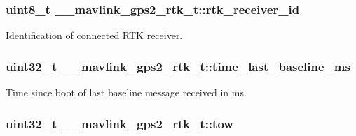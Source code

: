 \hypertarget{struct____mavlink__gps2__rtk__t_abae1e17d351ebd96bb155c3843fb5ee5}{
\subsubsection[{rtk\+\_\+receiver\+\_\+id}]{\setlength{\rightskip}{0pt plus 5cm}uint8\+\_\+t \+\_\+\+\_\+mavlink\+\_\+gps2\+\_\+rtk\+\_\+t\+::rtk\+\_\+receiver\+\_\+id}}\label{struct____mavlink__gps2__rtk__t_abae1e17d351ebd96bb155c3843fb5ee5}


Identification of connected R\+T\+K receiver. 

\hypertarget{struct____mavlink__gps2__rtk__t_a5e2d3de022e8a6d3a57aa5f828f3411a}{
\subsubsection[{time\+\_\+last\+\_\+baseline\+\_\+ms}]{\setlength{\rightskip}{0pt plus 5cm}uint32\+\_\+t \+\_\+\+\_\+mavlink\+\_\+gps2\+\_\+rtk\+\_\+t\+::time\+\_\+last\+\_\+baseline\+\_\+ms}}\label{struct____mavlink__gps2__rtk__t_a5e2d3de022e8a6d3a57aa5f828f3411a}


Time since boot of last baseline message received in ms. 

\hypertarget{struct____mavlink__gps2__rtk__t_a628d247767b00552231f28dc402b6b22}{
\subsubsection[{tow}]{\setlength{\rightskip}{0pt plus 5cm}uint32\+\_\+t \+\_\+\+\_\+mavlink\+\_\+gps2\+\_\+rtk\+\_\+t\+::tow}}\label{struct____mavlink__gps2__rtk__t_a628d247767b00552231f28dc402b6b22}


